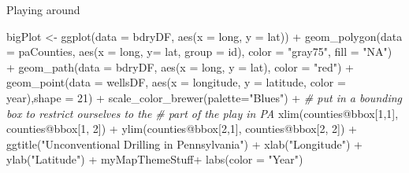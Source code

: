 \documentclass[
  ignorenonframetext,
]{beamer}
\newenvironment{Shaded}{\begin{snugshade}}{\end{snugshade}}
\newcommand{\AttributeTok}[1]{\textcolor[rgb]{0.77,0.63,0.00}{#1}}
\newcommand{\CommentTok}[1]{\textcolor[rgb]{0.56,0.35,0.01}{\textit{#1}}}
\newcommand{\DecValTok}[1]{\textcolor[rgb]{0.00,0.00,0.81}{#1}}
\newcommand{\FunctionTok}[1]{\textcolor[rgb]{0.00,0.00,0.00}{#1}}
\newcommand{\NormalTok}[1]{#1}
\newcommand{\OtherTok}[1]{\textcolor[rgb]{0.56,0.35,0.01}{#1}}
\newcommand{\SpecialCharTok}[1]{\textcolor[rgb]{0.00,0.00,0.00}{#1}}
\newcommand{\StringTok}[1]{\textcolor[rgb]{0.31,0.60,0.02}{#1}}
\begin{document}
\begin{frame}[fragile]{Playing around}
\protect\hypertarget{playing-around-1}{}
\tiny

\begin{Shaded}
\begin{Highlighting}[]
\NormalTok{bigPlot }\OtherTok{\textless{}{-}} \FunctionTok{ggplot}\NormalTok{(}\AttributeTok{data =}\NormalTok{ bdryDF, }\FunctionTok{aes}\NormalTok{(}\AttributeTok{x =}\NormalTok{ long, }\AttributeTok{y =}\NormalTok{ lat)) }\SpecialCharTok{+}
        \FunctionTok{geom\_polygon}\NormalTok{(}\AttributeTok{data =}\NormalTok{ paCounties, }\FunctionTok{aes}\NormalTok{(}\AttributeTok{x =}\NormalTok{ long, }\AttributeTok{y=}\NormalTok{ lat, }\AttributeTok{group =}\NormalTok{ id), }\AttributeTok{color =} \StringTok{"gray75"}\NormalTok{, }\AttributeTok{fill =} \StringTok{"NA"}\NormalTok{) }\SpecialCharTok{+}
        \FunctionTok{geom\_path}\NormalTok{(}\AttributeTok{data =}\NormalTok{ bdryDF, }\FunctionTok{aes}\NormalTok{(}\AttributeTok{x =}\NormalTok{ long, }\AttributeTok{y =}\NormalTok{ lat), }\AttributeTok{color =} \StringTok{"red"}\NormalTok{) }\SpecialCharTok{+}
        \FunctionTok{geom\_point}\NormalTok{(}\AttributeTok{data =}\NormalTok{ wellsDF, }\FunctionTok{aes}\NormalTok{(}\AttributeTok{x =}\NormalTok{ longitude, }\AttributeTok{y =}\NormalTok{ latitude, }\AttributeTok{color =}\NormalTok{ year),}\AttributeTok{shape =} \DecValTok{21}\NormalTok{) }\SpecialCharTok{+}
        \FunctionTok{scale\_color\_brewer}\NormalTok{(}\AttributeTok{palette=}\StringTok{"Blues"}\NormalTok{) }\SpecialCharTok{+}
      \CommentTok{\# put in a bounding box to restrict ourselves to the}
      \CommentTok{\# part of the play in PA}
        \FunctionTok{xlim}\NormalTok{(counties}\SpecialCharTok{@}\NormalTok{bbox[}\DecValTok{1}\NormalTok{,}\DecValTok{1}\NormalTok{], counties}\SpecialCharTok{@}\NormalTok{bbox[}\DecValTok{1}\NormalTok{, }\DecValTok{2}\NormalTok{]) }\SpecialCharTok{+}
        \FunctionTok{ylim}\NormalTok{(counties}\SpecialCharTok{@}\NormalTok{bbox[}\DecValTok{2}\NormalTok{,}\DecValTok{1}\NormalTok{], counties}\SpecialCharTok{@}\NormalTok{bbox[}\DecValTok{2}\NormalTok{, }\DecValTok{2}\NormalTok{]) }\SpecialCharTok{+}
        \FunctionTok{ggtitle}\NormalTok{(}\StringTok{"Unconventional Drilling in Pennsylvania"}\NormalTok{) }\SpecialCharTok{+}
        \FunctionTok{xlab}\NormalTok{(}\StringTok{"Longitude"}\NormalTok{) }\SpecialCharTok{+} 
        \FunctionTok{ylab}\NormalTok{(}\StringTok{"Latitude"}\NormalTok{) }\SpecialCharTok{+}
\NormalTok{        myMapThemeStuff}\SpecialCharTok{+}
        \FunctionTok{labs}\NormalTok{(}\AttributeTok{color =} \StringTok{"Year"}\NormalTok{)}
\end{Highlighting}
\end{Shaded}
\end{frame}
\end{document}
